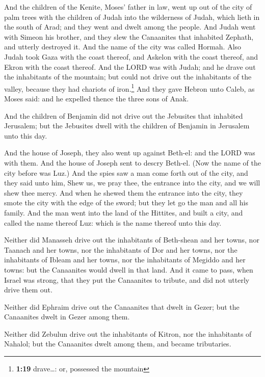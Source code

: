  And the children of the Kenite, Moses' father in law,
went up out of the city of palm trees with the children of Judah into
the wilderness of Judah, which lieth in the south of Arad; and they went
and dwelt among the people.  And Judah went with Simeon
his brother, and they slew the Canaanites that inhabited Zephath, and
utterly destroyed it. And the name of the city was called Hormah.
 Also Judah took Gaza with the coast thereof, and Askelon
with the coast thereof, and Ekron with the coast thereof.
 And the LORD was with Judah; and he drave out the
inhabitants of the mountain; but could not drive out the inhabitants of
the valley, because they had chariots of iron.\footnote{\textbf{1:19}
  drave\ldots: or, possessed the mountain}  And they gave
Hebron unto Caleb, as Moses said: and he expelled thence the three sons
of Anak.

 And the children of Benjamin did not drive out the
Jebusites that inhabited Jerusalem; but the Jebusites dwell with the
children of Benjamin in Jerusalem unto this day.

 And the house of Joseph, they also went up against
Beth-el: and the LORD was with them.  And the house of
Joseph sent to descry Beth-el. (Now the name of the city before was
Luz.)  And the spies saw a man come forth out of the
city, and they said unto him, Shew us, we pray thee, the entrance into
the city, and we will shew thee mercy.  And when he
shewed them the entrance into the city, they smote the city with the
edge of the sword; but they let go the man and all his family.
 And the man went into the land of the Hittites, and
built a city, and called the name thereof Luz: which is the name thereof
unto this day.

 Neither did Manasseh drive out the inhabitants of
Beth-shean and her towns, nor Taanach and her towns, nor the inhabitants
of Dor and her towns, nor the inhabitants of Ibleam and her towns, nor
the inhabitants of Megiddo and her towns: but the Canaanites would dwell
in that land.  And it came to pass, when Israel was
strong, that they put the Canaanites to tribute, and did not utterly
drive them out.

 Neither did Ephraim drive out the Canaanites that dwelt
in Gezer; but the Canaanites dwelt in Gezer among them.

 Neither did Zebulun drive out the inhabitants of Kitron,
nor the inhabitants of Nahalol; but the Canaanites dwelt among them, and
became tributaries.

